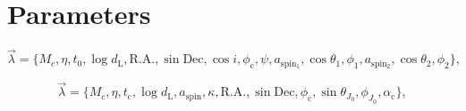 \documentclass[12pt]{iopart}
\begin{document}
\section{Parameters}

\begin{equation}
\vec{\lambda} = \{M_c, \eta, t_\mathrm{0}, \log{d_\mathrm{L}}, \mathrm{R.A.}, \sin\mathrm{Dec}, \cos{i}, \phi_\mathrm{c}, \psi, a_\mathrm{spin_1}, \cos{\theta_1}, \phi_1, a_\mathrm{spin_2}, \cos{\theta_2}, \phi_2\},
\end{equation}

\begin{equation}
\vec{\lambda} = \{M_c, \eta, t_\mathrm{c}, \log{d_\mathrm{L}}, a_\mathrm{spin}, \kappa, \mathrm{R.A.},\sin\mathrm{Dec}, \phi_\mathrm{c}, \sin\theta_{J_0}, \phi_{J_0}, \alpha_\mathrm{c}\},
\end{equation}
\end{document}
